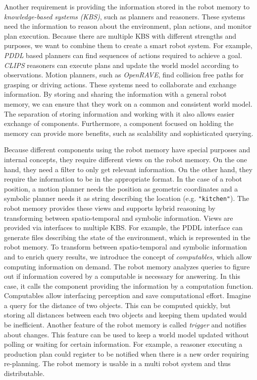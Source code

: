 Another requirement is providing the information stored in the robot
memory to \emph{knowledge-based systems (KBS)}, such as planners and
reasoners. These systems need the information to reason about the
environment, plan actions, and monitor plan execution. Because there
are multiple KBS with different strengths and purposes, we want to
combine them to create a smart robot system. For example, \emph{PDDL}
based planners can find sequences of actions required to achieve a
goal. \emph{CLIPS} reasoners can execute plans and update the world
model according to observations. Motion planners, such as
\emph{OpenRAVE}, find collision free paths for grasping or driving
actions. These systems need to collaborate and exchange
information. By storing and sharing the information with a general
robot memory, we can ensure that they work on a common and consistent
world model. The separation of storing information and working with it
also allows easier exchange of components. Furthermore, a component
focused on holding the memory can provide more benefits, such as
scalability and sophisticated querying.

Because different components using the robot memory have special
purposes and internal concepts, they require different views on the
robot memory. On the one hand, they need a filter to only get relevant
information. On the other hand, they require the information to be in
the appropriate format. In the case of a robot position, a
motion planner needs the position as geometric coordinates and a symbolic planner needs
it as string describing the location (e.g. \texttt{"kitchen"}). The robot memory
provides these views and supports hybrid reasoning by transforming
between spatio-temporal and symbolic information. Views are provided via
interfaces to multiple KBS. For example, the PDDL interface can
generate files describing the state of the environment, which is
represented in the robot memory.  To transform between spatio-temporal
and symbolic information and to enrich query results, we introduce the concept of
\emph{computables}, which allow computing information on demand. The
robot memory analyzes queries to figure out if information covered by
a computable is necessary for answering. In this case, it calls the
component providing the information by a computation
function. Computables allow interfacing perception and save
computational effort. Imagine a query for the distance of
two objects. This can be computed quickly, but storing all distances
between each two objects and keeping them updated would be
inefficient.
%
Another feature of the robot memory is called \emph{trigger} and
notifies about changes. This feature can be used to keep a world model updated
without polling or waiting for certain information. For example, a reasoner executing a production plan could
register to be notified when there is a new order requiring
re-planning. The robot memory is usable in a multi robot
system and thus distributable.


